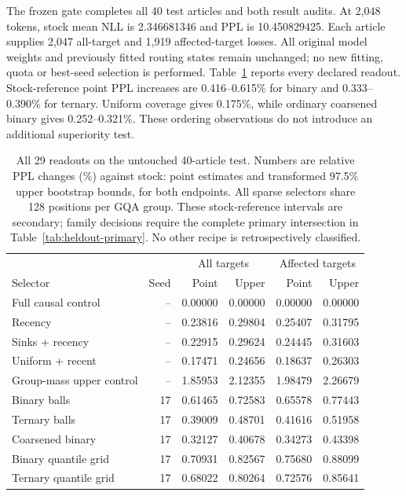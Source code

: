 \documentclass[11pt]{article}
\begin{document}
The frozen gate completes all 40 test articles and both result audits.
At 2,048 tokens, stock mean NLL is 2.346681346 and PPL is 10.450829425.
Each article supplies 2,047 all-target and 1,919 affected-target losses.
All original model weights and previously fitted routing states remain unchanged;
no new fitting, quota or best-seed selection is performed. Table~\ref{tab:heldout-all}
reports every declared readout. Stock-reference point PPL increases are
0.416--0.615\% for binary and 0.333--0.390\% for ternary. Uniform coverage
gives 0.175\%, while ordinary coarsened binary gives 0.252--0.321\%.
These ordering observations do not introduce an additional superiority test.

\begin{table}[p]
\centering\small
\caption{All 29 readouts on the untouched 40-article test. Numbers are relative
PPL changes (\%) against stock: point estimates and transformed 97.5\% upper
bootstrap bounds, for both endpoints. All sparse selectors share 128
positions per GQA group. These stock-reference intervals are secondary;
family decisions require the complete primary intersection in
Table~\ref{tab:heldout-primary}. No other recipe is retrospectively classified.}
\label{tab:heldout-all}
\begin{tabular}{lrrrrr}
\toprule
& & \multicolumn{2}{c}{All targets} & \multicolumn{2}{c}{Affected targets} \\
Selector & Seed & Point & Upper & Point & Upper \\
\midrule
Full causal control & -- & 0.00000 & 0.00000 & 0.00000 & 0.00000 \\
Recency & -- & 0.23816 & 0.29804 & 0.25407 & 0.31795 \\
Sinks + recency & -- & 0.22915 & 0.29624 & 0.24445 & 0.31603 \\
Uniform + recent & -- & 0.17471 & 0.24656 & 0.18637 & 0.26303 \\
Group-mass upper control & -- & 1.85953 & 2.12355 & 1.98479 & 2.26679 \\
\midrule
Binary balls & 17 & 0.61465 & 0.72583 & 0.65578 & 0.77443 \\
Ternary balls & 17 & 0.39009 & 0.48701 & 0.41616 & 0.51958 \\
Coarsened binary & 17 & 0.32127 & 0.40678 & 0.34273 & 0.43398 \\
Binary quantile grid & 17 & 0.70931 & 0.82567 & 0.75680 & 0.88099 \\
Ternary quantile grid & 17 & 0.68022 & 0.80264 & 0.72576 & 0.85641 \\

\end{tabular}
\end{table}
\end{document}
